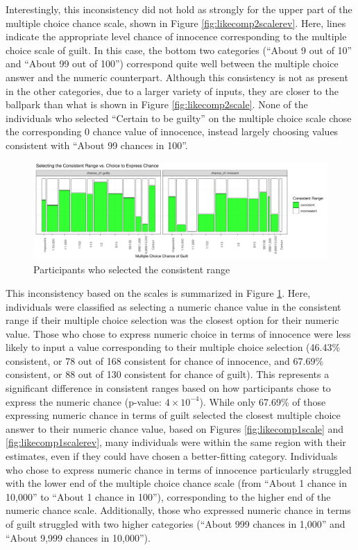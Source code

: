 \documentclass[print]{nuthesis}
\begin{document}
Interestingly, this inconsistency did not hold as strongly for the upper part of the multiple choice chance scale, shown in Figure \ref{fig:likecomp2scalerev}.
Here, lines indicate the appropriate level chance of innocence corresponding to the multiple choice scale of guilt.
In this case, the bottom two categories (``About 9 out of 10'' and ``About 99 out of 100'') correspond quite well between the multiple choice answer and the numeric counterpart.
Although this consistency is not as present in the other categories, due to a larger variety of inputs, they are closer to the ballpark than what is shown in Figure \ref{fig:likecomp2scale}.
None of the individuals who selected ``Certain to be guilty'' on the multiple choice scale chose the corresponding 0 chance value of innocence, instead largely choosing values consistent with ``About 99 chances in 100''.

\begin{figure}

{\centering \includegraphics[width=\linewidth]{thesis_files/figure-latex/correctrangemosaic-1} 

}

\caption{Participants who selected the consistent range}\label{fig:correctrangemosaic}
\end{figure}

This inconsistency based on the scales is summarized in Figure \ref{fig:correctrangemosaic}.
Here, individuals were classified as selecting a numeric chance value in the consistent range if their multiple choice selection was the closest option for their numeric value.
Those who chose to express numeric choice in terms of innocence were less likely to input a value corresponding to their multiple choice selection (46.43\% consistent, or 78 out of 168 consistent for chance of innocence, and 67.69\% consistent, or 88 out of 130 consistent for chance of guilt).
This represents a significant difference in consistent ranges based on how participants chose to express the numeric chance (p-value: \ensuremath{4\times 10^{-4}}).
While only 67.69\% of those expressing numeric chance in terms of guilt selected the closest multiple choice answer to their numeric chance value, based on Figures \ref{fig:likecomp1scale} and \ref{fig:likecomp1scalerev}, many individuals were within the same region with their estimates, even if they could have chosen a better-fitting category.
Individuals who chose to express numeric chance in terms of innocence particularly struggled with the lower end of the multiple choice chance scale (from ``About 1 chance in 10,000'' to ``About 1 chance in 100''), corresponding to the higher end of the numeric chance scale.
Additionally, those who expressed numeric chance in terms of guilt struggled with two higher categories (``About 999 chances in 1,000'' and ``About 9,999 chances in 10,000'').
\end{document}
